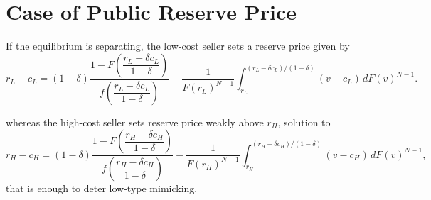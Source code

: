 \section{Case of Public Reserve Price}
\label{sec:public-reserve}

If the equilibrium is separating, the low-cost seller sets a reserve price given
by
\begin{equation}
  r_L - c_L
  = (1 - \delta)
    \frac{
      1 - F\!\left(\dfrac{r_L - \delta c_L}{1 - \delta}\right)
    }{
      f\!\left(\dfrac{r_L - \delta c_L}{1 - \delta}\right)
    }
  - \frac{1}{F(r_L)^{N-1}}
    \int_{r_L}^{(r_L - \delta c_L)/(1 - \delta)}
      (v - c_L)\, dF(v)^{N-1}.
  \label{eq:FOC-low-public}
\end{equation}

whereas the high-cost seller sets reserve price weakly above $r_H$, solution to
\begin{equation}
  r_H - c_H
  = (1 - \delta)
    \frac{
      1 - F\!\left(\dfrac{r_H - \delta c_H}{1 - \delta}\right)
    }{
      f\!\left(\dfrac{r_H - \delta c_H}{1 - \delta}\right)
    }
  - \frac{1}{F(r_H)^{N-1}}
    \int_{r_H}^{(r_H - \delta c_H)/(1 - \delta)}
      (v - c_H)\, dF(v)^{N-1},
  \label{eq:FOC-high-public}
\end{equation}
that is enough to deter low-type mimicking.
